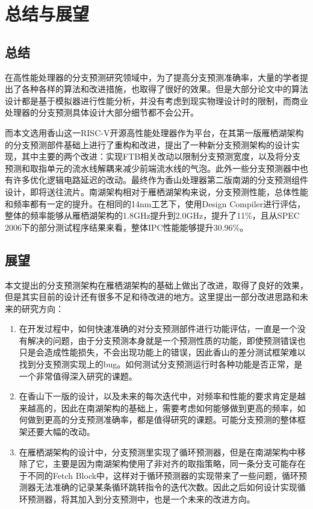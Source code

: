 
\chapter{总结与展望}

\section{总结}

在高性能处理器的分支预测研究领域中，为了提高分支预测准确率，大量的学者提出了各种各样的算法和改进措施，也取得了很好的效果。但是大部分论文中的算法设计都是基于模拟器进行性能分析，并没有考虑到现实物理设计时的限制，而商业处理器的分支预测具体设计大部分细节都不会公开。

而本文选用香山这一RISC-V开源高性能处理器作为平台，在其第一版雁栖湖架构的分支预测部件基础上进行了重构和改进，提出了一种新分支预测架构的设计实现，其中主要的两个改进：实现FTB相关改动以限制分支预测宽度，以及将分支预测和取指单元的流水线解耦来减少前端流水线的气泡。此外一些分支预测器中也有许多优化逻辑电路延迟的改动。最终作为香山处理器第二版南湖的分支预测组件设计，即将送往流片。南湖架构相对于雁栖湖架构来说，分支预测性能，总体性能和频率都有一定的提升。在相同的14nm工艺下，使用Design Compiler进行评估，整体的频率能够从雁栖湖架构的1.8GHz提升到2.0GHz，提升了11\%，且从SPEC 2006下的部分测试程序结果来看，整体IPC性能能够提升30.96\%。

\section{展望}

本文提出的分支预测架构在雁栖湖架构的基础上做出了改进，取得了良好的效果，但是其实目前的设计还有很多不足和待改进的地方。这里提出一部分改进思路和未来的研究方向：

\begin{enumerate}
    \item 在开发过程中，如何快速准确的对分支预测部件进行功能评估，一直是一个没有解决的问题，由于分支预测本身就是一个预测性质的功能，即使预测错误也只是会造成性能损失，不会出现功能上的错误，因此香山的差分测试框架难以找到分支预测实现上的bug。如何测试分支预测运行时各种功能是否正常，是一个非常值得深入研究的课题。
    \item 在香山下一版的设计，以及未来的每次迭代中，对频率和性能的要求肯定是越来越高的，因此在南湖架构的基础上，需要考虑如何能够做到更高的频率，如何做到更高的分支预测准确率，都是值得研究的课题。可能分支预测的整体框架还要大幅的改动。
    \item 在雁栖湖架构的设计中，分支预测里实现了循环预测器，但是在南湖架构中移除了它，主要是因为南湖架构使用了非对齐的取指策略，同一条分支可能存在于不同的Fetch Block中，这样对于循环预测器的实现带来了一些问题，循环预测器无法准确的记录某条循环跳转指令的迭代次数。因此之后如何设计实现循环预测器，将其加入到分支预测中，也是一个未来的改进方向。
\end{enumerate}

